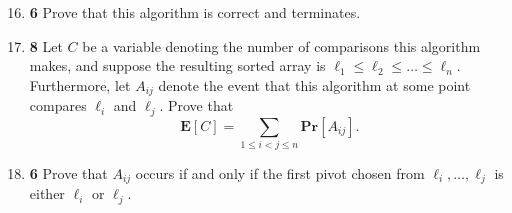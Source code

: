 \documentclass[12pt]{article}
\theoremstyle{plain}
\theoremstyle{definition}
\theoremstyle{remark}
\renewcommand{\Pr}{\textbf{Pr}}
\newcommand{\E}{\textbf{E}}
\newcommand{\pts}[1]{\lbrack\textbf{#1}\rbrack}
\begin{document}
\begin{enumerate}
\setcounter{enumi}{15}

\item \pts{6} Prove that this algorithm is correct and terminates.

\begin{comment}\begin{tcolorbox}
Each time the algorithm is called, it is called on lists of sizes strictly less than that of the previous call. Since $n=0,1$ are covered, it will eventually terminate.

To prove correctness, note that in the end $L_1$ is a sorted list of elements of $L$ that are $\le L[p]$ and $L_2$ is a sorted list of elements of $L$ that are $>L[p]$, so $[L_1,L[p],L_2]$ is $L$ sorted.
\end{tcolorbox}\end{comment}

\item \pts{8} Let $C$ be a variable denoting the number of comparisons this algorithm makes, and suppose the resulting sorted array is $\ell_1\le\ell_2\le\dots\le\ell_n$. Furthermore, let $A_{ij}$ denote the event that this algorithm at some point compares $\ell_i$ and $\ell_j$. Prove that \[\E[C]=\sum_{1\le i<j\le n}\Pr[A_{ij}].\]

\begin{comment}\begin{tcolorbox}
Recall that $A_{ij}$ can happen at most once. Thus, let $B_{ij}$ be the random variable that is $1$ if $A_{ij}$ occurs and $0$ if $A_{ij}$ doesn't occur. By linearity of expectation, we have \[\E[C]=\E\left[\sum_{1\le i<j\le n}B_{ij}\right]=\sum_{1\le i<j\le n}\E[B_{ij}]=\sum_{1\le i<j\le n}\Pr[A_{ij}]\]
\end{tcolorbox}\end{comment}

\item \pts{6} Prove that $A_{ij}$ occurs if and only if the first pivot chosen from $\ell_i,\dots,\ell_j$ is either $\ell_i$ or $\ell_j$.

\begin{comment}\begin{tcolorbox}
If either $\ell_i$ or $\ell_j$ is chosen as a pivot, then it is compared to all other elements among $\ell_i,\ell_{i+1},\dots,\ell_j$, so $A_{ij}$ occurs. If $\ell_k$ is chosen as a pivot before $\ell_i$ or $\ell_j$, then they will be broken up into different sets and thus never compared.
\end{tcolorbox}\end{comment}


\end{enumerate}
\end{document}
